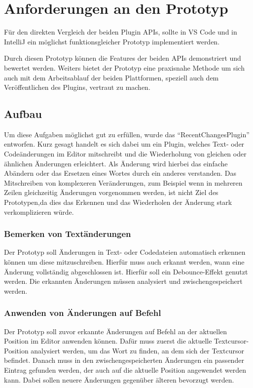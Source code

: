 \chapter{Anforderungen an den Prototyp}
\label{cha:Prototyp}

Für den direkten Vergleich der beiden Plugin APIs, sollte 
in VS Code und in IntelliJ ein möglichst funktionsgleicher 
Prototyp implementiert werden.

Durch diesen Prototyp können die Features der beiden APIs 
demonstriert und bewertet werden. Weiters bietet der Prototyp
eine praxisnahe Methode um sich auch mit dem Arbeitsablauf der
beiden Plattformen, speziell auch dem Veröffentlichen
des Plugins, vertraut zu machen.

\section{Aufbau}
\label{sec:Prototyp_Aufbau}

Um diese Aufgaben möglichst gut zu erfüllen, wurde das
\enquote{RecentChangesPlugin} entworfen. Kurz gesagt handelt
es sich dabei um ein Plugin, welches Text- oder Codeänderungen 
im Editor mitschreibt und die Wiederholung von gleichen oder
ähnlichen Änderungen erleichtert.
Als Änderung wird hierbei das einfache Abändern oder das Ersetzen eines
Wortes durch ein anderes verstanden. 
Das Mitschreiben von komplexeren Veränderungen, zum Beispiel 
wenn in mehreren Zeilen gleichzeitig Änderungen vorgenommen 
werden, ist nicht Ziel des Prototypen,da dies das Erkennen 
und das Wiederholen der Änderung stark verkomplizieren würde.

\subsection{Bemerken von Textänderungen}

Der Prototyp soll Änderungen in Text- oder Codedateien automatisch
erkennen können um diese mitzuschreiben. Hierfür muss auch erkannt
werden, wann eine Änderung vollständig abgeschlossen ist. Hierfür
soll ein Debounce-Effekt %
genutzt werden. Die erkannten Änderungen 
müssen analysiert und zwischengespeichert werden.

\subsection{Anwenden von Änderungen auf Befehl}

Der Prototyp soll zuvor erkannte Änderungen auf Befehl an der
aktuellen Position im Editor anwenden können. Dafür muss zuerst die
aktuelle Textcursor-Position analysiert werden, um das Wort zu finden,
an dem sich der Textcursor befindet. Danach muss in den 
zwischengespeicherten Änderungen ein passender Eintrag gefunden werden,
der auch auf die aktuelle Position angewendet werden kann.
Dabei sollen neuere Änderungen gegenüber älteren bevorzugt werden.

